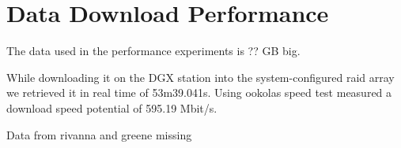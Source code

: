 \documentclass[sigplan,screen]{acmart}
\begin{document}

\section{Data Download Performance}


The data used in the performance experiments is ?? GB big. 

While downloading it on the DGX station into the system-configured raid array we retrieved it in real time of 53m39.041s. Using ookolas speed test measured a download speed potential of 595.19 Mbit/s.

Data from rivanna and greene missing

\end{document}
